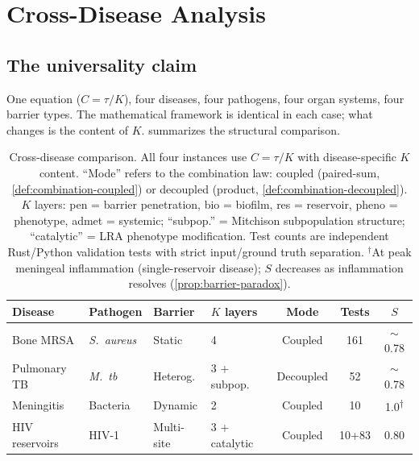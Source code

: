 \documentclass[11pt]{article}
\theoremstyle{plain}
\theoremstyle{definition}
\begin{document}
\section{Cross-Disease Analysis}
\label{sec:cross-disease}

\subsection{The universality claim}
\label{sec:universality}

One equation ($C = \tau/K$), four diseases, four pathogens, four
organ systems, four barrier types. The mathematical framework is
identical in each case; what changes is the content of $K$.
 summarizes the structural comparison.

\begin{table}[t]
\centering
\small
\setlength{\tabcolsep}{4pt}
\begin{tabular}{llllccc}
\toprule
\textbf{Disease} & \textbf{Pathogen} & \textbf{Barrier} &
  \textbf{$K$ layers} & \textbf{Mode} &
  \textbf{Tests} & $S$ \\
\midrule
Bone MRSA &
  \emph{S.\ aureus} &
  Static &
  4 &
  Coupled &
  161 &
  $\sim$0.78 \\
Pulmonary TB &
  \emph{M.\ tb} &
  Heterog. &
  3 + subpop. &
  Decoupled &
  52 &
  $\sim$0.78 \\
Meningitis &
  Bacteria &
  Dynamic &
  2 &
  Coupled &
  10 &
  1.0\textsuperscript{$\dagger$} \\
HIV reservoirs &
  HIV-1 &
  Multi-site &
  3 + catalytic &
  Coupled &
  10{+}83 &
  0.80 \\
\bottomrule
\end{tabular}
\caption{Cross-disease comparison. All four instances use
$C = \tau / K$ with disease-specific $K$ content. ``Mode'' refers
to the combination law: coupled (paired-sum,
\cref{def:combination-coupled}) or decoupled (product,
\cref{def:combination-decoupled}). $K$ layers: pen = barrier
penetration, bio = biofilm, res = reservoir, pheno = phenotype,
admet = systemic; ``subpop.'' = Mitchison subpopulation structure;
``catalytic'' = LRA phenotype modification. Test counts are
independent Rust/Python validation tests with strict input/ground
truth separation.  $^\dagger$At peak meningeal inflammation
(single-reservoir disease); $S$ decreases as inflammation resolves
(\cref{prop:barrier-paradox}).}
\label{tab:universality}
\end{table}
\end{document}
